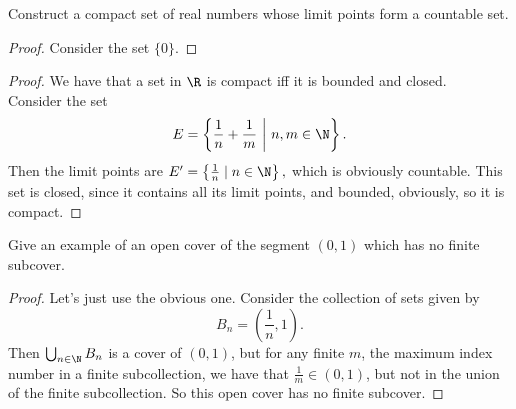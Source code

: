 \documentclass{assignment}
\begin{document}
\begin{question}[2.13]
  Construct a compact set of real numbers whose limit points form a countable set.
\end{question}
\begin{proof}
  Consider the set $\{0\}$. 
\end{proof}
\begin{proof}
  We have that a set in $\R$ is compact iff it is bounded and closed. \\

  Consider the set $$E = \left\{\frac{1}{n} + \frac{1}{m}\ \middle|\ n,m\in\N \right\}.$$ Then the limit
  points are $E' = \left\{\frac{1}{n}\mid n\in\N\right\},$ which is obviously countable. This set is
  closed, since it contains all its limit points, and bounded, obviously, so it is compact. 
\end{proof}

\begin{question}[2.14]
  Give an example of an open cover of the segment $(0,1)$ which has no finite subcover.
\end{question}
\begin{proof}
  Let's just use the obvious one. Consider the collection of sets given by
  $$B_n = \left(\frac{1}{n}, 1\right).$$ Then $\bigcup_{n\in\N}B_n$ is a cover of $(0,1)$, but for any
  finite $m$, the maximum index number in a finite subcollection, we have that $\frac{1}{m}\in(0,1)$,
  but not in the union of the finite subcollection. So this open cover has no finite subcover.
\end{proof}
\end{document}
